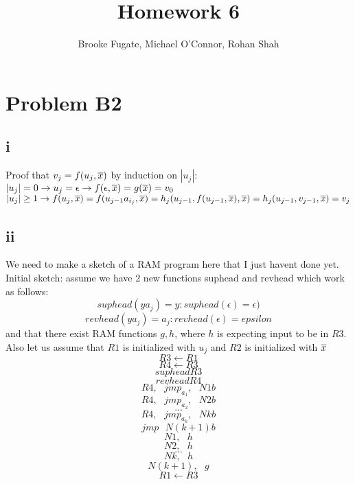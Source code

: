 \documentclass[12pt]{article}
\begin{document}
\pagestyle{plain}
\titleformat{\subsection}[runin]
  {\normalfont\large\bfseries}{\thesubsection}{1em}{}
\titleformat{\subsubsection}[runin]
  {\bfseries}{}{1em}{}

\title{Homework 6}
\author{Brooke Fugate, Michael O'Connor, Rohan Shah}
\date{}

\maketitle

\section*{Problem B2}
\subsection*{i}
Proof that $v_j = f(u_j, \overline{x})$ by induction on $|u_j|$: \newline
$|u_j| = 0 \rightarrow u_j = \epsilon \rightarrow f(\epsilon, \overline{x}) = g(\overline{x}) = v_0$\newline
$|u_j| \ge 1 \rightarrow f(u_j, \overline{x}) = f(u_{j-1}a_{i_j}, \overline{x}) = h_j(u_{j-1}, f(u_{j-1}, \overline{x}), \overline{x}) = h_j(u_{j-1}, v_{j-1}, \overline{x}) = v_j$

\subsection*{ii}
We need to make a sketch of a RAM  program here that I just havent done yet. Initial sketch:\newline
assume we have 2 new functions suphead and revhead which work as follows: $$suphead(ya_j) = y : suphead(\epsilon) = \epsilon)$$ $$revhead(ya_j) = a_j : revhead(\epsilon) = epsilon$$ and that there exist RAM functions $g , h$, where $h$ is expecting input to be in $R3$.  Also let us assume that $R1$ is initialized with $u_j$ and $R2$ is initialized with $\overline{x}$
$$R3 \leftarrow R1$$
$$R4 \leftarrow R3$$
$$suphead R3$$
$$revhead R4$$
$$R4,  \text{ }  jmp_{a_1},  \text{ }  N1b$$
$$R4,  \text{ }  jmp_{a_2},  \text{ }  N2b$$
$$...$$
$$R4,  \text{ }  jmp_{a_k},  \text{ }  Nkb$$
$$jmp \text{ } N(k+1)b$$
$$N1,  \text{ } h$$
$$N2,  \text{ } h$$
$$...$$
$$Nk,  \text{ } h$$
$$N(k+1), \text{ }  g$$
$$R1 \leftarrow R3$$
\end{document}
